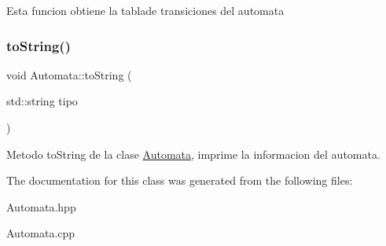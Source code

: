 Esta funcion obtiene la tablade transiciones del automata \mbox{\label{class_automata_ac95575b672e736c6f1bcc75f4cacf15d}} 
\subsubsection{\texorpdfstring{to\+String()}{toString()}}
{\footnotesize\ttfamily void Automata\+::to\+String (\begin{DoxyParamCaption}\item[{std\+::string}]{tipo }\end{DoxyParamCaption})}

Metodo to\+String de la clase \hyperlink{class_automata}{Automata}, imprime la informacion del automata. 

The documentation for this class was generated from the following files\+:\begin{DoxyCompactItemize}
\item 
Automata.\+hpp\item 
Automata.\+cpp\end{DoxyCompactItemize}
